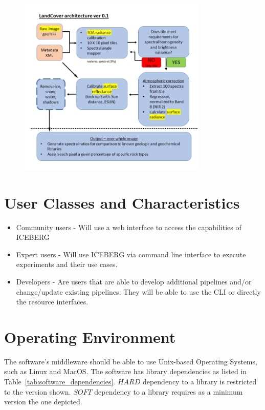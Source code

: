 \documentclass{scrreprt}
\begin{document}
\begin{figure}[H]
 \centering
 \includegraphics[width=0.8\textwidth]{landcoverarch}
\end{figure}

\section{User Classes and Characteristics}

\begin{itemize}
	\item Community users - Will use a web interface to access the capabilities
	of ICEBERG
	\item Expert users - Will use ICEBERG via command line interface to execute 
	experiments and their use cases.
	\item Developers - Are users that are able to develop additional pipelines 
	and/or change/update existing pipelines. They will be able to use the CLI or 
	directly the resource interfaces.
\end{itemize}

\section{Operating Environment}

The software's middleware should be able to use Unix-based Operating Systems, such 
as Linux and MacOS. The software has library dependencies as listed in 
Table~\ref{tab:software_dependencies}. $HARD$ dependency to a library is restricted 
to the version shown. $SOFT$ dependency to a library requires as a minimum version 
the one depicted.
\end{document}
